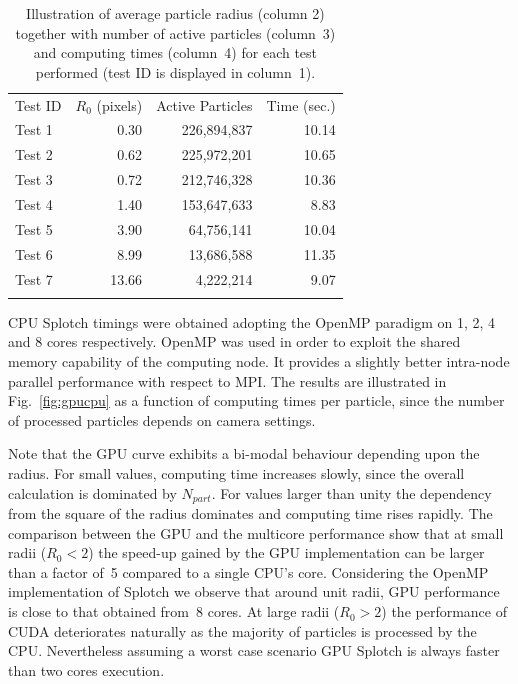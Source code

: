 \documentclass[preprint,5pt]{elsarticle}
\begin{document}
\begin{table}
\label{tab:bin}
\begin{tabular}{lrrr}
\hline\noalign{\smallskip}
Test ID & $R_0$ (pixels) & Active Particles & Time (sec.) \\
\noalign{\smallskip} \hline \noalign{\smallskip}
Test 1  & 0.30   & 226,894,837  & 10.14 \\
Test 2  & 0.62   & 225,972,201  & 10.65 \\
Test 3  & 0.72   & 212,746,328  & 10.36 \\
Test 4  & 1.40   & 153,647,633  & 8.83 \\
Test 5  & 3.90   & 64,756,141   & 10.04 \\
Test 6  & 8.99   & 13,686,588   & 11.35 \\
Test 7  & 13.66  & 4,222,214    & 9.07 \\
\noalign{\smallskip} \hline
\end{tabular}
\caption{Illustration of average particle radius (column 2) together with number of active particles (column~3) and computing times (column~4) for each test performed (test ID is displayed in column~1).}
\end{table}

CPU Splotch timings were obtained adopting the OpenMP paradigm on 1, 2, 4 and 8 cores respectively. OpenMP was used in order to exploit the shared memory capability of the computing node. It provides a slightly better intra-node parallel performance with respect to MPI. The results are illustrated in Fig.~\ref{fig:gpucpu} as a function of computing times per particle, since the number of processed particles depends on camera settings.

Note that the GPU curve exhibits a bi-modal behaviour depending upon the radius. For small values, computing time increases slowly, since the overall calculation is dominated by $N_{part}$. For values larger than unity the dependency from the square of the radius dominates and computing time rises rapidly. The comparison between the GPU and the multicore performance show that at small radii ($R_0 < 2$) the speed-up gained by the GPU implementation can be larger than a factor of~5 compared to a single CPU's core. Considering the OpenMP implementation of Splotch we observe that around unit radii, GPU performance is close to that obtained from~8 cores. At large radii ($R_0 > 2$) the performance of CUDA deteriorates naturally as the majority of particles is processed by the CPU. Nevertheless assuming a worst case scenario GPU Splotch is always faster than two cores execution. 
\end{document}
